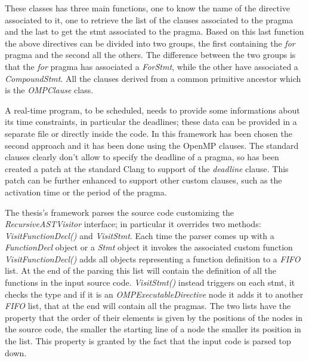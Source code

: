 \documentclass[a4paper,11pt,oneside]{book}
\begin{document}
These classes has three main functions, one to know the name of the directive associated to it, one to retrieve the list of the clauses associated to the pragma and the last to get the stmt associated to the pragma. Based on this last function the above directives can be divided into two groups, the first containing the \emph{for} pragma and the second all the others. The difference between the two groups is that the \emph{for} pragma has associated a \emph{ForStmt}, while the other have associated a \emph{CompoundStmt}. All the clauses derived from a common primitive ancestor which is the \emph{OMPClause} class. 

A real-time program, to be scheduled, needs to provide some informations about its time constraints, in particular the deadlines; these data can be provided in a separate file or directly inside the code. In this framework has been chosen the second approach and it has been done using the OpenMP clauses. The standard clauses clearly don’t allow to specify the deadline of a pragma, so has been created a patch at the standard Clang to support of the \emph{deadline} clause. This patch can be further enhanced to support other custom clauses, such as the activation time or the period of the pragma.

The thesis’s framework parses the source code customizing the \emph{RecursiveASTVisitor} interface; in particular it overrides two methods: \emph{VisitFunctionDecl()} and \emph{VisitStmt}. Each time the parser comes up with a \emph{FunctionDecl} object or a \emph{Stmt} object it invokes the associated custom function \emph{VisitFunctionDecl()} adds all objects representing a function definition to a \emph{FIFO} list.  At the end of the parsing this list will contain the definition of all the functions in the input source code. \emph{VisitStmt()} instead triggers on each stmt, it checks the type and if it is an \emph{OMPExecutableDirective} node it adds it to another \emph{FIFO} list, that at the end will contain all the pragmas. The two lists have the property that the order of their elements is given by the positions of the nodes in the source code, the smaller the starting line of a node the smaller its position in the list. This property is granted by the fact that the input code is parsed top down.
\end{document}
